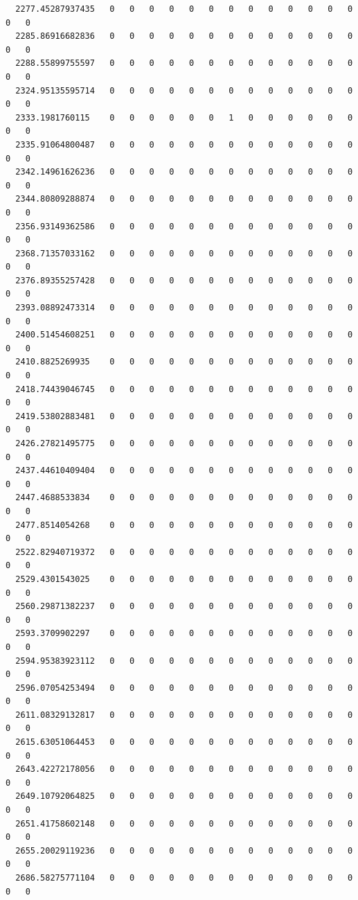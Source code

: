 \documentclass[
  letterpaper,
  DIV=11,
  numbers=noendperiod]{scrartcl}
\begin{document}
\begin{verbatim}
  2277.45287937435   0   0   0   0   0   0   0   0   0   0   0   0   0   0   0
  2285.86916682836   0   0   0   0   0   0   0   0   0   0   0   0   0   0   0
  2288.55899755597   0   0   0   0   0   0   0   0   0   0   0   0   0   0   0
  2324.95135595714   0   0   0   0   0   0   0   0   0   0   0   0   0   0   0
  2333.1981760115    0   0   0   0   0   0   1   0   0   0   0   0   0   0   0
  2335.91064800487   0   0   0   0   0   0   0   0   0   0   0   0   0   0   0
  2342.14961626236   0   0   0   0   0   0   0   0   0   0   0   0   0   0   0
  2344.80809288874   0   0   0   0   0   0   0   0   0   0   0   0   0   0   0
  2356.93149362586   0   0   0   0   0   0   0   0   0   0   0   0   0   0   0
  2368.71357033162   0   0   0   0   0   0   0   0   0   0   0   0   0   0   0
  2376.89355257428   0   0   0   0   0   0   0   0   0   0   0   0   0   0   0
  2393.08892473314   0   0   0   0   0   0   0   0   0   0   0   0   0   0   0
  2400.51454608251   0   0   0   0   0   0   0   0   0   0   0   0   0   0   0
  2410.8825269935    0   0   0   0   0   0   0   0   0   0   0   0   0   0   0
  2418.74439046745   0   0   0   0   0   0   0   0   0   0   0   0   0   0   0
  2419.53802883481   0   0   0   0   0   0   0   0   0   0   0   0   0   0   0
  2426.27821495775   0   0   0   0   0   0   0   0   0   0   0   0   0   0   0
  2437.44610409404   0   0   0   0   0   0   0   0   0   0   0   0   0   0   0
  2447.4688533834    0   0   0   0   0   0   0   0   0   0   0   0   0   0   0
  2477.8514054268    0   0   0   0   0   0   0   0   0   0   0   0   0   0   0
  2522.82940719372   0   0   0   0   0   0   0   0   0   0   0   0   0   0   0
  2529.4301543025    0   0   0   0   0   0   0   0   0   0   0   0   0   0   0
  2560.29871382237   0   0   0   0   0   0   0   0   0   0   0   0   0   0   0
  2593.3709902297    0   0   0   0   0   0   0   0   0   0   0   0   0   0   0
  2594.95383923112   0   0   0   0   0   0   0   0   0   0   0   0   0   0   0
  2596.07054253494   0   0   0   0   0   0   0   0   0   0   0   0   0   0   0
  2611.08329132817   0   0   0   0   0   0   0   0   0   0   0   0   0   0   0
  2615.63051064453   0   0   0   0   0   0   0   0   0   0   0   0   0   0   0
  2643.42272178056   0   0   0   0   0   0   0   0   0   0   0   0   0   0   0
  2649.10792064825   0   0   0   0   0   0   0   0   0   0   0   0   0   0   0
  2651.41758602148   0   0   0   0   0   0   0   0   0   0   0   0   0   0   0
  2655.20029119236   0   0   0   0   0   0   0   0   0   0   0   0   0   0   0
  2686.58275771104   0   0   0   0   0   0   0   0   0   0   0   0   0   0   0

\end{verbatim}
\end{document}
